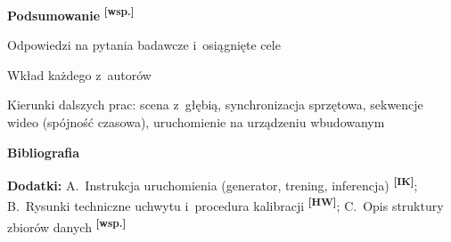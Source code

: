 \documentclass[11pt,a4paper]{article}
\newcommand{\IK}{\textsuperscript{\textbf{[IK]}}}
\newcommand{\HW}{\textsuperscript{\textbf{[HW]}}}
\newcommand{\WS}{\textsuperscript{\textbf{[wsp.]}}}
\begin{document}
\begin{toc}
\item \textbf{Podsumowanie} \WS
  \begin{toc}
    \item Odpowiedzi na pytania badawcze i~osiągnięte cele
    \item Wkład każdego z~autorów
    \item Kierunki dalszych prac: scena z~głębią, synchronizacja sprzętowa, sekwencje wideo
          (spójność czasowa), uruchomienie na urządzeniu wbudowanym
  \end{toc}

\item[] \textbf{Bibliografia}
\item[] \textbf{Dodatki:} A.~Instrukcja uruchomienia (generator, trening, inferencja) \IK;
        B.~Rysunki techniczne uchwytu i~procedura kalibracji \HW; C.~Opis struktury zbiorów danych \WS
\end{toc}
\end{document}

